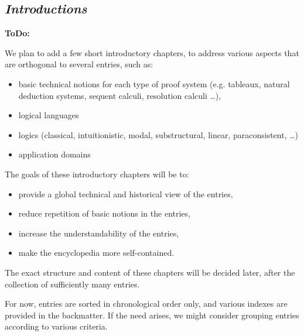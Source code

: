 
\begin{partbacktext}
\part{\emph{Introductions}}

\noindent \begin{large}\textbf{ToDo:} \end{large}

\noindent We plan to add a few short introductory chapters, to address various aspects that are orthogonal to several entries, such as: 
\begin{itemize}
\item basic technical notions for each type of proof system (e.g. tableaux, natural deduction systems, sequent calculi, resolution calculi \ldots),
\item logical languages
\item logics (classical, intuitionistic, modal, substructural, linear, paraconsistent, \ldots)
\item application domains
\end{itemize}

\noindent
The goals of these introductory chapters will be to:
\begin{itemize} 
\item provide a global technical and historical view of the entries,
\item reduce repetition of basic notions in the entries,
\item increase the understandability of the entries,
\item make the encyclopedia more self-contained.
\end{itemize}

\noindent
The exact structure and content of these chapters will be decided later, after the collection of sufficiently many entries.

For now, entries are sorted in chronological order only, and various indexes are provided in the backmatter. If the need arises, we might consider grouping entries according to various criteria.


\end{partbacktext}